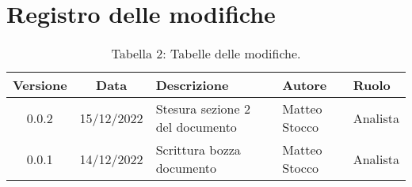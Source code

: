 \section*{Registro delle modifiche}
\begin{table}[H]
	\centering
	\renewcommand\tabularxcolumn[1]{>{\Centering}m{#1}}
	\begin{tabularx}{\textwidth}{| c | c | X | X | X |} 
	\hline
	\textbf{Versione} & \textbf{Data} & \textbf{Descrizione} & \textbf{Autore} & \textbf{Ruolo}\\
	\hline
	0.0.2 & 15/12/2022 & Stesura sezione 2 del documento & Matteo Stocco & Analista \\
	\hline
	0.0.1 & 14/12/2022 & Scrittura bozza documento & Matteo Stocco & Analista \\
	\hline
	\end{tabularx}
	\vspace{10pt}
	\caption{Tabella 2: Tabelle delle modifiche.}
\end{table}
